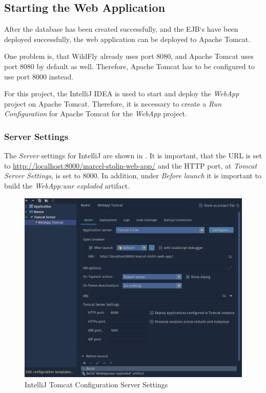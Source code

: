 \subsection{Starting the Web Application}\label{sec:03_depl_webapp}
After the database has been created successfully, and the EJB`s have been deployed successfully, the web application can be deployed to Apache Tomcat.

One problem is, that WildFly already uses port 8080, and Apache Tomcat uses port 8080 by default as well. Therefore, Apache Tomcat has to be configured to use port 8000 instead. 

For this project, the IntelliJ IDEA is used to start and deploy the \textit{WebApp} project on Apache Tomcat. Therefore, it is necessary to create a \textit{Run Configuration} for Apache Tomcat for the \textit{WebApp} project.

\subsubsection{Server Settings}
The \textit{Server} settings for IntelliJ are shown in . It is important, that the URL is set to \url{http://localhost:8000/marcel-stolin-web-app/} and the HTTP port, at \textit{Tomcat Server Settings},  is set to 8000. In addition, under \textit{Before launch} it is important to build the \textit{WebApp:war exploded} artifact.
\begin{figure}[h]
\centering
\includegraphics[scale=0.2]{images/03_depl/tomcat-config-1}
\caption{IntelliJ Tomcat Configuration Server Settings}
\label{fig:03_depl_webapp_intellij_config1}
\end{figure}

